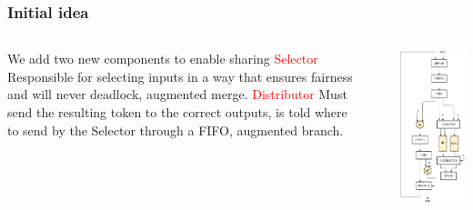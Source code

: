 \documentclass{beamer}
\renewcommand{\emph}{\textcolor{red}}
\begin{document}
\begin{frame}[fragile]
\frametitle{Initial idea}
\begin{columns}[T]
    \begin{column}{0.45\textwidth}
    We add two new components to enable sharing \newline \newline
    \emph{Selector} \newline
    Responsible for selecting inputs in a way that ensures fairness and will never deadlock, augmented merge. 
    \newline 
    \newline
    \emph{Distributor} \newline
    Must send the resulting token to the correct outputs, is told where to send by the Selector  through a FIFO, augmented branch.
    \end{column}
    \begin{column}{0.1\textwidth}
    \end{column}
    \begin{column}{0.45\textwidth}
      \includegraphics[scale=0.28]{shared_base_case.png}
    \end{column}
  \end{columns}
\end{frame}
\end{document}
